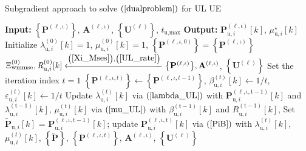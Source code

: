 \documentclass[10pt,journal]{IEEEtran}
\newcommand{\paren}[1]{\left({#1}\right)}
\newcommand{\bracket}[1]{{\left [{#1}\right ]}}
\newcommand{\braces}[1]{{\left\{ {#1}\right\}}}
\newcommand{\sfrac}[2]{#1/#2}
\theoremstyle{definition}
\begin{document}
\begin{algorithm}[ht!]
\par\noindent\small
\caption{Subgradient approach to solve $\paren{\ref{dualproblem}}$ for UL UE}
\label{ULalgorithm}
\begin{algorithmic}[1]
\Statex \textbf{Input: } $\braces{\mathbf{P}^{\paren{\mathrm{\ell,\iota}}}}$,  $\mathbf{A}^{\paren{\mathrm{\ell,\iota}}}$, $\braces{\mathbf{U}^{\paren{\mathrm{\ell}}}}$, $t_{\textrm{u,max}}$
\Statex \textbf{Output:} $\mathbf{P}^{\paren{\mathrm{\ell,\iota}}}_{\textrm{u},i}\bracket{k}$, $\mu^\star_{\textrm{u},i}\bracket{k}$
\State Initialize $\lambda^{\paren{\mathrm{0}}}_{\textrm{u},i}\bracket{k}=1$, $\mu^{\paren{\mathrm{0}}}_{\textrm{u},i}\bracket{k}=1$, $\braces{\mathbf{P}^{\paren{\ell,\iota,0}}}=\braces{\mathbf{P}^{\paren{\mathrm{\ell,\iota}}}}$ 
\State $\Xi^{\paren{\mathrm{0}}}_{\textrm{wmmse}},\mathit{R}^{\paren{\mathrm{0}}}_{\textrm{u},i}\bracket{k}\xleftarrow{\paren{\mathrm{\ref{Xi_Mses}}},\paren{\mathrm{\ref{UL_rate}}}}\braces{\mathbf{P}^{\paren{\mathrm{\ell,\iota}}}},\mathbf{A}^{\paren{\mathrm{\ell,\iota}}}$, $\braces{\mathbf{U}^{\paren{\mathrm{\ell}}}}$
\State Set the iteration index $t=1$
\Repeat
\State $\braces{\mathbf{P}^{\paren{\ell,\iota,t}}}\leftarrow\braces{\mathbf{P}^{\paren{\ell,\iota,t-1}}}$, $\beta^{\paren{t}}_{\textrm{u},i}\bracket{k}\leftarrow\sfrac{1}{t}$, $\varepsilon^{\paren{t}}_{\textrm{u},i}\bracket{k}\leftarrow\sfrac{1}{t}$
\State Update $\lambda^{\paren{t}}_{\textrm{u},i}\bracket{k}$ via $\mathrm{\paren{\ref{lambda_UL}}}$ with $\mathbf{P}^{\paren{\mathrm{\ell,\iota,t-1}}}_{\textrm{u},i}\bracket{k}$ and $\lambda^{\paren{\mathrm{t-1}}}_{\textrm{u},i}\bracket{k}$, $\mu^{\paren{t}}_{\textrm{u},i}\bracket{k}$ via $\mathrm{\paren{\ref{mu_UL}}}$ with $\beta^{\paren{\mathrm{t-1}}}_{\textrm{u},i}\bracket{k}$ and $\mathit{R}^{\paren{\mathrm{t-1}}}_{\textrm{u},i}\bracket{k}$, 
\State Set $\widetilde{\mathbf{P}}_{\textrm{u},i}\bracket{k}$ = $\mathbf{P}^{\paren{\mathrm{\ell,\iota,t-1}}}_{\textrm{u},i}\bracket{k}$; update $\mathbf{P}^{\paren{\mathrm{\ell,\iota,t}}}_{\textrm{u},i}\bracket{k}$ via $\mathrm{\paren{\ref{PiB}}}$ with $\lambda^{\paren{t}}_{\textrm{u},i}\bracket{k}$, $\mu^{\paren{t}}_{\textrm{u},i}\bracket{k}$, $\braces{\widetilde{\mathbf{P}}}$, $\braces{\mathbf{P}^{\paren{\ell,\iota,t}}}$, $\mathbf{A}^{\paren{\mathrm{\ell,\iota}}}$, $\braces{\mathbf{U}^{\paren{\mathrm{\ell}}}}$

\end{algorithmic}
\end{algorithm}
\end{document}
